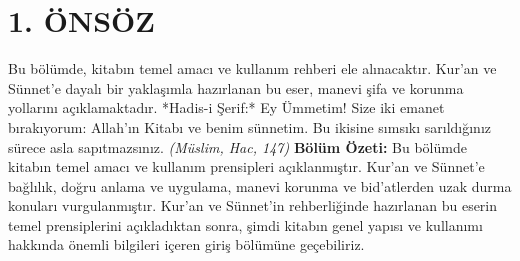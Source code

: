 \documentclass[12pt,a4paper]{article}
\begin{document}
\section{1. ÖNSÖZ}
Bu bölümde, kitabın temel amacı ve kullanım rehberi ele alınacaktır. Kur'an ve Sünnet'e dayalı bir yaklaşımla hazırlanan bu eser, manevi şifa ve korunma yollarını açıklamaktadır.
*Hadis-i Şerif:* Ey Ümmetim! Size iki emanet bırakıyorum: Allah'ın Kitabı ve benim sünnetim. Bu ikisine sımsıkı sarıldığınız sürece asla sapıtmazsınız. \textit{(Müslim, Hac, 147)}
\textbf{Bölüm Özeti:}
Bu bölümde kitabın temel amacı ve kullanım prensipleri açıklanmıştır. Kur'an ve Sünnet'e bağlılık, doğru anlama ve uygulama, manevi korunma ve bid'atlerden uzak durma konuları vurgulanmıştır.
Kur'an ve Sünnet'in rehberliğinde hazırlanan bu eserin temel prensiplerini açıkladıktan sonra, şimdi kitabın genel yapısı ve kullanımı hakkında önemli bilgileri içeren giriş bölümüne geçebiliriz.
\end{document}
